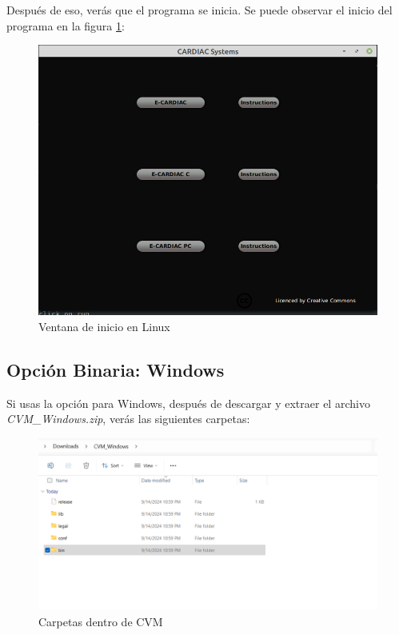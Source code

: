 \documentclass[letterpaper,12pt,oneside]{book}
\begin{document}
Después de eso, verás que el programa se inicia. Se puede observar el inicio del programa en la figura \ref{fig:github_startwindowlinux123}:

\begin{figure}[h]		
				\centering
				\includegraphics[scale=0.5]{media_g/start_window_on_linux.png}
				\caption{Ventana de inicio en Linux}
				\label{fig:github_startwindowlinux123}
\end{figure}


\clearpage


\subsection{Opción Binaria: Windows}

Si usas la opción para Windows, después de descargar y extraer el archivo \textit{CVM\_Windows.zip}, verás las siguientes carpetas:

\begin{figure}[h]		
				\centering
				\includegraphics[scale=0.5]{media_g/folders_windows.png}
				\caption{Carpetas dentro de CVM}
				\label{fig:github_folders_windows}
\end{figure}
\end{document}
